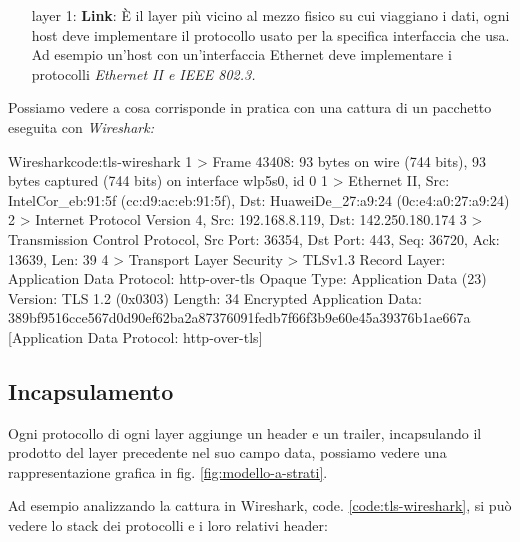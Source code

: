 \begin{enumerate}
    \item[layer 1:] \textbf{Link}: È il layer più vicino al mezzo fisico su cui viaggiano i dati, ogni host deve implementare il protocollo usato per la specifica interfaccia che usa. Ad esempio un'host con un'interfaccia Ethernet deve implementare i protocolli \it{Ethernet II} e \it{IEEE 802.3}.
    

\end{enumerate}

Possiamo vedere a cosa corrisponde in pratica con una cattura di un pacchetto eseguita con \it{Wireshark}:

\begin{bashcode}{Wireshark}{code:tls-wireshark}
1 > Frame 43408: 93 bytes on wire (744 bits), 93 bytes captured (744 bits) on interface wlp5s0, id 0
1 > Ethernet II, Src: IntelCor_eb:91:5f (cc:d9:ac:eb:91:5f), Dst: HuaweiDe_27:a9:24 (0c:e4:a0:27:a9:24)
2 > Internet Protocol Version 4, Src: 192.168.8.119, Dst: 142.250.180.174
3 > Transmission Control Protocol, Src Port: 36354, Dst Port: 443, Seq: 36720, Ack: 13639, Len: 39
4 > Transport Layer Security
     > TLSv1.3 Record Layer: Application Data Protocol: http-over-tls
             Opaque Type: Application Data (23)
             Version: TLS 1.2 (0x0303)
             Length: 34
             Encrypted Application Data: 389bf9516cce567d0d90ef62ba2a87376091fedb7f66f3b9e60e45a39376b1ae667a
             [Application Data Protocol: http-over-tls]
\end{bashcode}

\subsection{Incapsulamento}

Ogni protocollo di ogni layer aggiunge un header e un trailer, incapsulando il prodotto del layer precedente nel suo campo data, possiamo vedere una rappresentazione grafica in fig. \ref{fig:modello-a-strati}.

Ad esempio analizzando la cattura in Wireshark, code. \ref{code:tls-wireshark}, si può vedere lo stack dei protocolli e i loro relativi header:


